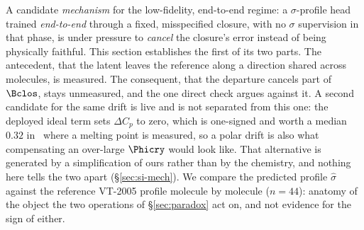A candidate \emph{mechanism} for the low-fidelity, end-to-end regime: a $\sigma$-profile head trained
\emph{end-to-end} through a fixed, misspecified closure, with no $\sigma$ supervision in that phase,
is under pressure to \emph{cancel} the closure's error instead of being physically faithful. This
section establishes the first of its two parts. The antecedent, that the latent leaves the reference
along a direction shared across molecules, is measured. The consequent, that the departure cancels
part of $\Bclos$, stays unmeasured, and the one direct check argues against it. A second candidate
for the same drift is live and is not separated from this one: the deployed ideal term sets
$\Delta C_p$ to zero, which is one-signed and worth a median $0.32$ in \lnx\ where a melting point
is measured, so a polar drift is also what compensating an over-large $\Phicry$ would look like.
That alternative is generated by a simplification of ours rather than by the chemistry, and nothing
here tells the two apart (\S\ref{sec:si-mech}). We compare the
predicted profile $\hat\sigma$ against the reference VT-2005 profile molecule by molecule ($n{=}44$):
anatomy of the object the two operations of \S\ref{sec:paradox} act on, and not evidence for the sign
of either.

